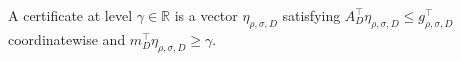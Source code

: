 A certificate at level \(\gamma\in\mathbb R\) is a vector \(\eta_{\rho,\sigma,D}\) satisfying \(A_D^\top\eta_{\rho,\sigma,D}\le g_{\rho,\sigma,D}^\top\) coordinatewise and \(m_D^\top\eta_{\rho,\sigma,D}\ge\gamma\).